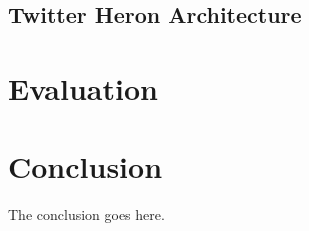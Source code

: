 \documentclass[conference]{IEEEtran}
\begin{document}
\subsection{Twitter Heron Architecture}
\label{sec:TwitterHeronArchitecture}



\section{Evaluation}
\label{sec:Evaluation}

\cite{TwitterHeronBlog}

\cite{TwitterHeron}


\section{Conclusion}
\label{sec:Conclusion}

The conclusion goes here.




\end{document}
